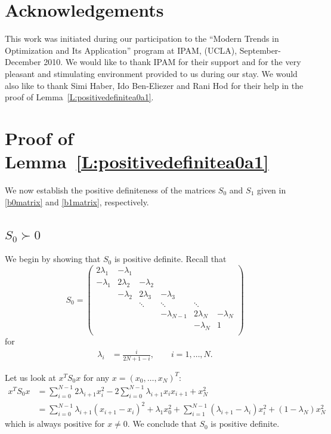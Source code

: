 \documentclass[12pt]{article}
\numberwithin{equation}{section}
\theoremstyle{definition}
\theoremstyle{remark}
\begin{document}
\section{Acknowledgements}
This work was initiated during our participation to the ``Modern Trends in Optimization and
Its Application'' program at IPAM, (UCLA), September-December 2010. We would like to thank
IPAM for their support and for the very pleasant and stimulating environment provided to us
during our stay. We would also like to thank Simi Haber, Ido Ben-Eliezer and Rani Hod for
their help in the proof of Lemma~\ref{L:positivedefinitea0a1}.

\appendix

\section{Proof of Lemma~\ref{L:positivedefinitea0a1}}
We now establish the positive definiteness of the matrices $S_0$ and $S_1$
given in \eqref{b0matrix} and \eqref{b1matrix}, respectively.

\subsection{$S_0 \succ 0$}
We begin by showing that $S_0$ is positive definite. Recall that
\[
    S_0=
    \begin{pmatrix}
        2 \lambda_1     & -\lambda_1            \\
        -\lambda_1          & 2 \lambda_2   & -\lambda_2                \\
            &       -\lambda_2          & 2 \lambda_3   & -\lambda_3                \\
                                    &        & \ddots        &\ddots &   \ddots\\
                                            & &                 &       -\lambda_{N-1}  & 2 \lambda_N & -\lambda_N \\
                                            & &                 &        &  -\lambda_N  & 1\\
    \end{pmatrix}
\]
for
\begin{align*}
    \lambda_i &= \frac{i}{2 N+1-i}, \qquad i=1,\dots,N.
\end{align*}

Let us look at $x^T S_0 x$ for any $x=(x_0,\dots,x_N)^T$:
\begin{align*}
    x^T S_0 x
        &= \sum_{i=0}^{N-1} 2\lambda_{i+1} x_i^2 -2\sum_{i=0}^{N-1} \lambda_{i+1} x_i x_{i+1} + x_N^2\\
        &= \sum_{i=0}^{N-1} \lambda_{i+1} (x_{i+1}-x_i)^2 +\lambda_1 x_0^2+\sum_{i=1}^{N-1} (\lambda_{i+1}-\lambda_i) x_i^2+(1-\lambda_N)x_N^2
\end{align*}
which is always positive for $x\neq 0$. We conclude that $S_0$ is positive definite.
\end{document}
